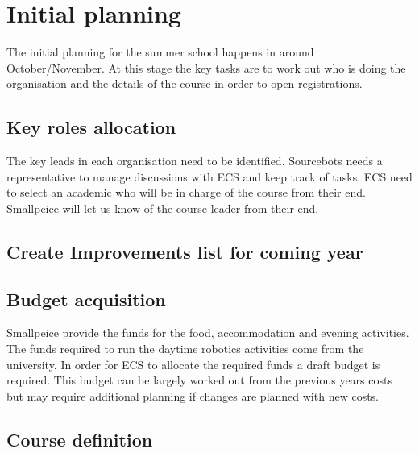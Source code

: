 \section{Initial planning}

The initial planning for the summer school happens in around October/November.
At this stage the key tasks are to work out who is doing the organisation and the details of the course in order to open registrations.

\subsection{Key roles allocation}

The key leads in each organisation need to be identified.
Sourcebots needs a representative to manage discussions with ECS and keep track of tasks.
ECS need to select an academic who will be in charge of the course from their end.
Smallpeice will let us know of the course leader from their end.


\subsection{Create Improvements list for coming year}


\subsection{Budget acquisition}

Smallpeice provide the funds for the food, accommodation and evening activities.
The funds required to run the daytime robotics activities come from the university.
In order for ECS to allocate the required funds a draft budget is required.
This budget can be largely worked out from the previous years costs but may require additional planning if changes are planned with new costs.


\subsection{Course definition}

